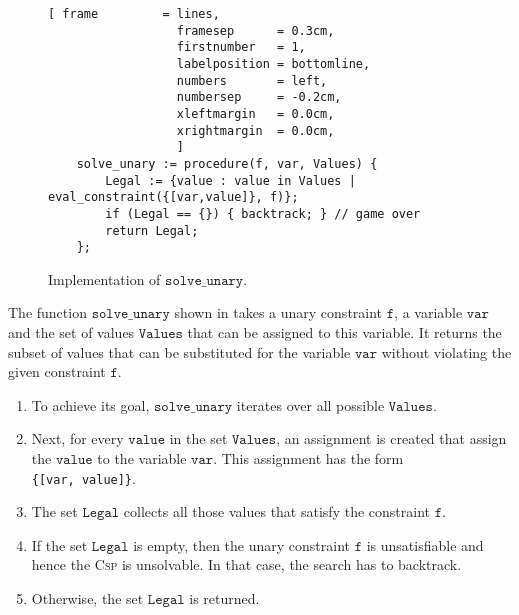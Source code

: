 \begin{figure}[!ht]
\centering
\begin{Verbatim}[ frame         = lines, 
                  framesep      = 0.3cm, 
                  firstnumber   = 1,
                  labelposition = bottomline,
                  numbers       = left,
                  numbersep     = -0.2cm,
                  xleftmargin   = 0.0cm,
                  xrightmargin  = 0.0cm,
                  ]
    solve_unary := procedure(f, var, Values) {
        Legal := {value : value in Values | eval_constraint({[var,value]}, f)};
        if (Legal == {}) { backtrack; } // game over
        return Legal;
    };
\end{Verbatim}
\vspace*{-0.3cm}
\caption{Implementation of $\texttt{solve\_unary}$.}
\label{fig:csp-constraint-propagation.stlx:solve_unary}
\end{figure}

The function $\texttt{solve\_unary}$ shown in  takes a unary
constraint $\texttt{f}$, a variable $\texttt{var}$ and the set of values $\texttt{Values}$ that can be assigned to this
variable.  It returns the subset of values that can be substituted for the variable $\texttt{var}$
without violating the given constraint $\texttt{f}$.
\begin{enumerate}
\item To achieve its goal, $\texttt{solve\_unary}$ iterates over all possible $\texttt{Values}$.  
\item Next, for every $\texttt{value}$ in the set $\texttt{Values}$, an assignment is created that assign
      the $\texttt{value}$ to the variable $\texttt{var}$.  This assignment has the form
      \\[0.2cm]
      \hspace*{1.3cm}
      \texttt{\{[var, value]\}}.
\item The set $\texttt{Legal}$ collects all those values that satisfy the constraint $\texttt{f}$.
\item If the set $\texttt{Legal}$ is empty, then the unary constraint $\texttt{f}$ is unsatisfiable and hence
      the \textsc{Csp} is unsolvable.  In that case, the search has to backtrack.
\item Otherwise, the set  $\texttt{Legal}$ is returned.
\end{enumerate}

